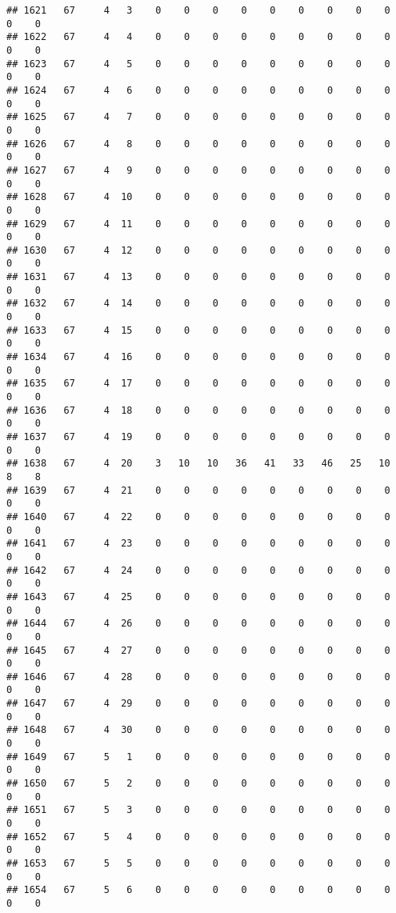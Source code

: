 \documentclass[]{article}
\begin{document}
\begin{verbatim}
## 1621   67     4   3    0    0    0    0    0    0    0    0    0    0    0
## 1622   67     4   4    0    0    0    0    0    0    0    0    0    0    0
## 1623   67     4   5    0    0    0    0    0    0    0    0    0    0    0
## 1624   67     4   6    0    0    0    0    0    0    0    0    0    0    0
## 1625   67     4   7    0    0    0    0    0    0    0    0    0    0    0
## 1626   67     4   8    0    0    0    0    0    0    0    0    0    0    0
## 1627   67     4   9    0    0    0    0    0    0    0    0    0    0    0
## 1628   67     4  10    0    0    0    0    0    0    0    0    0    0    0
## 1629   67     4  11    0    0    0    0    0    0    0    0    0    0    0
## 1630   67     4  12    0    0    0    0    0    0    0    0    0    0    0
## 1631   67     4  13    0    0    0    0    0    0    0    0    0    0    0
## 1632   67     4  14    0    0    0    0    0    0    0    0    0    0    0
## 1633   67     4  15    0    0    0    0    0    0    0    0    0    0    0
## 1634   67     4  16    0    0    0    0    0    0    0    0    0    0    0
## 1635   67     4  17    0    0    0    0    0    0    0    0    0    0    0
## 1636   67     4  18    0    0    0    0    0    0    0    0    0    0    0
## 1637   67     4  19    0    0    0    0    0    0    0    0    0    0    0
## 1638   67     4  20    3   10   10   36   41   33   46   25   10    8    8
## 1639   67     4  21    0    0    0    0    0    0    0    0    0    0    0
## 1640   67     4  22    0    0    0    0    0    0    0    0    0    0    0
## 1641   67     4  23    0    0    0    0    0    0    0    0    0    0    0
## 1642   67     4  24    0    0    0    0    0    0    0    0    0    0    0
## 1643   67     4  25    0    0    0    0    0    0    0    0    0    0    0
## 1644   67     4  26    0    0    0    0    0    0    0    0    0    0    0
## 1645   67     4  27    0    0    0    0    0    0    0    0    0    0    0
## 1646   67     4  28    0    0    0    0    0    0    0    0    0    0    0
## 1647   67     4  29    0    0    0    0    0    0    0    0    0    0    0
## 1648   67     4  30    0    0    0    0    0    0    0    0    0    0    0
## 1649   67     5   1    0    0    0    0    0    0    0    0    0    0    0
## 1650   67     5   2    0    0    0    0    0    0    0    0    0    0    0
## 1651   67     5   3    0    0    0    0    0    0    0    0    0    0    0
## 1652   67     5   4    0    0    0    0    0    0    0    0    0    0    0
## 1653   67     5   5    0    0    0    0    0    0    0    0    0    0    0
## 1654   67     5   6    0    0    0    0    0    0    0    0    0    0    0

\end{verbatim}
\end{document}
